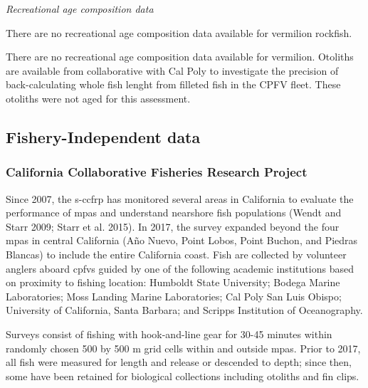 \documentclass[11pt,
  english,
  a4paper,
]{article}
\begin{document}
\emph{Recreational age composition data}

There are no recreational age composition data available for vermilion rockfish.

There are no recreational age composition data available for vermilion. Otoliths are available from collaborative with Cal Poly to investigate the precision of back-calculating whole fish lenght from filleted fish in the CPFV fleet. These otoliths were not aged for this assessment.


\hypertarget{fishery-independent-data}{%
\subsection{Fishery-Independent data}\label{fishery-independent-data}}

\leavevmode\tagmcend\tagstructend


\hypertarget{california-collaborative-fisheries-research-project}{%
\subsubsection{California Collaborative Fisheries Research Project}\label{california-collaborative-fisheries-research-project}}

\leavevmode\tagmcend\tagstructend

Since 2007, the \Gls{s-ccfrp} has monitored several areas in California to evaluate the performance of \Gls{mpa}s and understand nearshore fish populations {(Wendt and Starr 2009; Starr et al. 2015)\leavevmode\tagmcend\tagstructend}. In 2017, the survey expanded beyond the four \Gls{mpa}s in central California (Año Nuevo, Point Lobos, Point Buchon, and Piedras Blancas) to include the entire California coast. Fish are collected by volunteer anglers aboard \Gls{cpfv}s guided by one of the following academic institutions based on proximity to fishing location: Humboldt State University; Bodega Marine Laboratories; Moss Landing Marine Laboratories; Cal Poly San Luis Obispo; University of California, Santa Barbara; and Scripps Institution of Oceanography.

Surveys consist of fishing with hook-and-line gear for 30-45 minutes within randomly chosen 500 by 500 m grid cells within and outside \Gls{mpa}s. Prior to 2017, all fish were measured for length and release or descended to depth; since then, some have been retained for biological collections including otoliths and fin clips.
\end{document}
